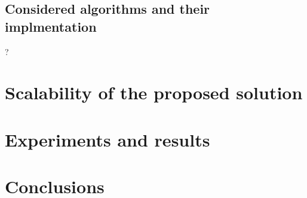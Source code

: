 \documentclass[a4paper,12pt]{article}
\begin{document}
\subsection{Considered algorithms and their implmentation}
?

\section{Scalability of the proposed solution}

\section{Experiments and results}

\section{Conclusions}
\end{document}
